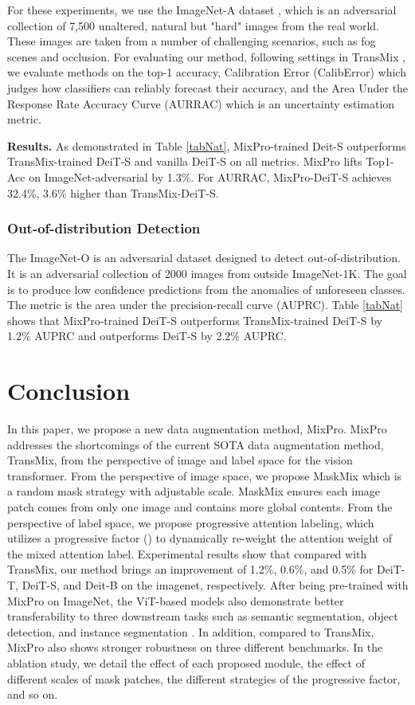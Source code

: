 \documentclass{article} \usepackage{iclr2023_conference,times}
\begin{document}
For these experiments, we use the ImageNet-A dataset \citep{hendrycks2021natural}, which is an adversarial collection of 7,500 unaltered, natural but "hard" images from the real world. These images are taken from a number of challenging scenarios, such as fog scenes and occlusion. For evaluating our method, following settings in TransMix \citep{chen2021transmix}, we evaluate methods on the top-1 accuracy, Calibration Error (CalibError) \citep{hendrycks2021natural} which judges how classifiers can reliably forecast their accuracy, and the Area Under the Response Rate Accuracy Curve (AURRAC) which is an uncertainty estimation metric.

\textbf{Results.} As demonstrated in Table \ref{tabNat}, MixPro-trained Deit-S outperforms TransMix-trained DeiT-S and vanilla DeiT-S on all metrics. MixPro lifts Top1-Acc on ImageNet-adversarial by 1.3\%. For AURRAC, MixPro-DeiT-S achieves 32.4\%, 3.6\% higher than TransMix-DeiT-S.
\subsubsection{Out-of-distribution Detection}
The ImageNet-O \citep{hendrycks2021natural} is an adversarial dataset designed to detect out-of-distribution. It is an adversarial collection of 2000 images from outside ImageNet-1K. The goal is to produce low confidence predictions from the anomalies of unforeseen classes. The metric is the area under the precision-recall curve (AUPRC). Table \ref{tabNat} shows that MixPro-trained DeiT-S outperforms TransMix-trained DeiT-S by 1.2\% AUPRC and outperforms DeiT-S by 2.2\% AUPRC.

 \vspace{-10px}

\section{Conclusion}
\label{subExp}
In this paper, we propose a new data augmentation method, MixPro. MixPro addresses the shortcomings of the current SOTA data augmentation method, TransMix, from the perspective of image and label space for the vision transformer. From the perspective of image space, we propose MaskMix which is a random mask strategy with adjustable scale. MaskMix ensures each image patch comes from only one image and contains more global contents. From the perspective of label space, we propose progressive attention labeling, which utilizes a progressive factor () to dynamically re-weight the attention weight of the mixed attention label. Experimental results show that compared with TransMix, our method brings an improvement of 1.2\%, 0.6\%, and 0.5\% for DeiT-T,  DeiT-S, and Deit-B on the imagenet, respectively. After being pre-trained with MixPro on ImageNet, the ViT-based models also demonstrate better transferability to three downstream tasks such as semantic segmentation, object detection, and instance segmentation . In addition, compared to TransMix, MixPro also shows stronger robustness on three different benchmarks. In the ablation study, we detail the effect of each proposed module, the effect of different scales of mask patches, the different strategies of the progressive factor, and so on.
\end{document}
